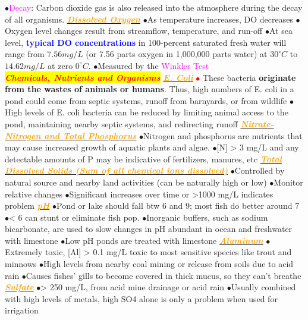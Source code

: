 \documentclass{article}
\newcommand{\ddd}{$\bullet$}
\newcommand{\red}[1]{\textcolor{red}{#1}}
\newcommand{\blue}[1]{\textcolor{blue}{#1}}
\newcommand{\pink}[1]{\textcolor{magenta}{#1}}
\newcommand{\orange}[1]{\textcolor{orange}{#1}}
\newcommand{\mysection}[1]{\colorbox{yellow}{\textbf{\textit{\red{#1}}}}}
\newcommand{\mysubsection}[1]{\underline{\textbf{{\textit{\orange{#1}}}}}}
\newcommand{\vocab}[1]{{\pink{#1}}}
\begin{document}
\begin{multicols*}{4}
            \ddd \vocab{Decay}: Carbon dioxide gas is also released into the atmosphere during the decay of all organisms.
        \mysubsection{Dissolved Oxygen}
            \ddd As temperature increases, DO decreases
            \ddd Oxygen level changes result from streamflow, temperature, and run-off
            \ddd At sea level, \textbf{\blue{typical DO concentrations}} in 100-percent saturated fresh water will range from $7.56 mg/L$ (or 7.56 parts oxygen in 1,000,000 parts water) at $30^\circ C$ to $14.62 mg/L$ at zero $0^\circ C$.
            \ddd Measured by the \vocab{Winkler Test}
            \\
    \mysection{Chemicals, Nutrients and Organisms}
        \mysubsection{E. Coli}
            \red{\ddd} These bacteria \textbf{originate from the wastes of animals or humans}. Thus, high numbers of E. coli in a pond could come from septic systems, runoff from barnyards, or from wildlife
            \ddd High levels of E. coli bacteria can be reduced by limiting animal access to the pond, maintaining nearby septic systems, and redirecting runoff
        \mysubsection{Nitrate-Nitrogen and Total Phosphorus}
            \ddd Nitrogen and phosphorus are nutrients that may cause increased growth of aquatic plants and algae.
            \ddd [N] > 3 mg/L and any detectable amounts of P may be indicative of fertilizers, manures, etc
        \mysubsection{Total Dissolved Solids (Sum of all chemical ions dissolved)}
            \ddd Controlled by natural source and nearby land activities (can be naturally high or low)
            \ddd Monitor relative changes
            \ddd Significant increases over time or >1000 mg/L indicates problem
        \mysubsection{pH}
            \ddd Pond or lake should fall btw 6 and 9; most fish do better around 7
            \ddd < 6 can stunt or eliminate fish pop.
            \ddd Inorganic buffers, such as sodium bicarbonate, are used to slow changes in pH abundant in ocean and freshwater with limestone
            \ddd Low pH ponds are treated with limestone
        \mysubsection{Aluminum}
            \ddd Extremely toxic, [Al] > 0.1 mg/L toxic to most sensitive species like trout and minnows
            \ddd High levels from nearby coal mining or release from soils due to acid rain
            \ddd Causes fishes’ gills to become covered in thick mucus, so they can’t breathe
        \mysubsection{Sulfate}
            \ddd > 250 mg/L, from acid mine drainage or acid rain
            \ddd Usually combined with high levels of metals, high SO4 alone is only a problem when used for irrigation

\end{multicols*}
\end{document}
